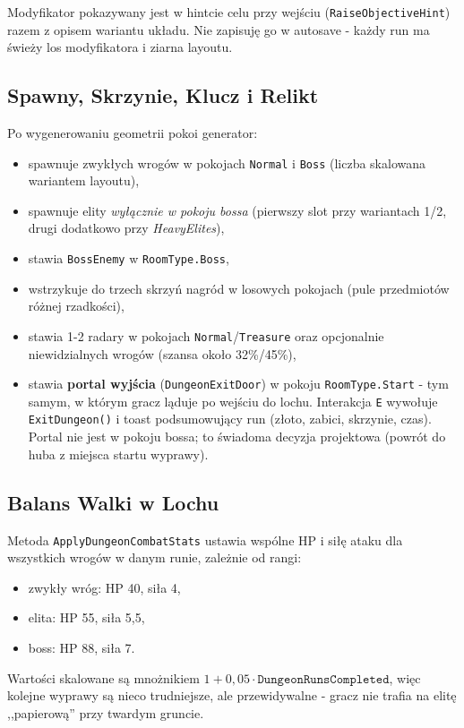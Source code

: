 Modyfikator pokazywany jest w hintcie celu przy wejściu (\texttt{RaiseObjectiveHint}) razem z opisem wariantu układu. Nie zapisuję go w autosave - każdy run ma świeży los modyfikatora i ziarna layoutu.

\subsection{Spawny, Skrzynie, Klucz i Relikt}

Po wygenerowaniu geometrii pokoi generator:
\begin{itemize}
    \item spawnuje zwykłych wrogów w pokojach \texttt{Normal} i \texttt{Boss} (liczba skalowana wariantem layoutu),
    \item spawnuje elity \emph{wyłącznie w pokoju bossa} (pierwszy slot przy wariantach 1/2, drugi dodatkowo przy \textit{HeavyElites}),
    \item stawia \texttt{BossEnemy} w \texttt{RoomType.Boss},
    \item wstrzykuje do trzech skrzyń nagród w losowych pokojach (pule przedmiotów różnej rzadkości),
    \item stawia 1-2 radary w pokojach \texttt{Normal}/\texttt{Treasure} oraz opcjonalnie niewidzialnych wrogów (szansa około 32\%/45\%),
    \item stawia \textbf{portal wyjścia} (\texttt{DungeonExitDoor}) w pokoju \texttt{RoomType.Start} - tym samym, w którym gracz ląduje po wejściu do lochu. Interakcja \texttt{E} wywołuje \texttt{ExitDungeon()} i toast podsumowujący run (złoto, zabici, skrzynie, czas). Portal nie jest w pokoju bossa; to świadoma decyzja projektowa (powrót do huba z miejsca startu wyprawy).
\end{itemize}

\subsection{Balans Walki w Lochu}

Metoda \texttt{ApplyDungeonCombatStats} ustawia wspólne HP i siłę ataku dla wszystkich wrogów w danym runie, zależnie od rangi:
\begin{itemize}
    \item zwykły wróg: HP 40, siła 4,
    \item elita: HP 55, siła 5,5,
    \item boss: HP 88, siła 7.
\end{itemize}
Wartości skalowane są mnożnikiem $1 + 0{,}05 \cdot \texttt{DungeonRunsCompleted}$, więc kolejne wyprawy są nieco trudniejsze, ale przewidywalne - gracz nie trafia na elitę ,,papierową'' przy twardym gruncie.

